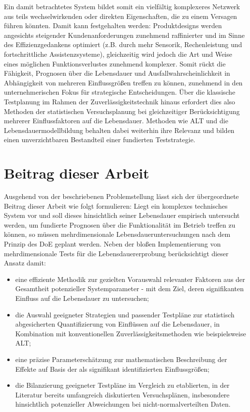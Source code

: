 Ein damit betrachtetes System bildet somit ein vielfältig komplexeres Netzwerk aus teils wechselwirkenden oder direkten Eigenschaften, die zu einem Versagen führen könnten.
Damit kann festgehalten werden: Produktdesigns werden angesichts steigender Kundenanforderungen zunehmend raffinierter und im Sinne des Effizienzgedankens optimiert (z.B. durch mehr Sensorik, Rechenleistung und fortschrittliche Assistenzsysteme), gleichzeitig wird jedoch die Art und Weise eines möglichen Funktionsverlustes zunehmend komplexer.
Somit rückt die Fähigkeit, Prognosen über die Lebensdauer und Ausfallwahrscheinlichkeit in Abhängigkeit von mehreren Einflussgrößen treffen zu können, zunehmend in den unternehmerischen Fokus für strategische Entscheidungen.
Über die klassische Testplanung im Rahmen der Zuverlässigkeitstechnik hinaus erfordert dies also Methoden der statistischen Versuchsplanung bei gleichzeitiger Berücksichtigung mehrerer Einflussfaktoren auf die Lebensdauer.
Methoden wie \acs{ALT} und die Lebensdauermodellbildung behalten dabei weiterhin ihre Relevanz und bilden einen unverzichtbaren Bestandteil einer fundierten Teststrategie.

\section{Beitrag dieser Arbeit} \label{sec:beitrag}
Ausgehend von der beschriebenen Problemstellung lässt sich der übergeordnete Beitrag dieser Arbeit wie folgt formulieren: Liegt ein komplexes technisches System vor und soll dieses hinsichtlich seiner Lebensdauer empirisch untersucht werden, um fundierte Prognosen über die Funktionalität im Betrieb treffen zu können, so müssen mehrdimensionale Lebensdaueruntersuchungen nach dem Prinzip des \ac{DoE} geplant werden.
Neben der bloßen Implementierung von mehrdimensionale Tests für die Lebensdauererprobung berücksichtigt dieser Ansatz damit:
\begin{itemize}
    \item eine effiziente Methodik zur gezielten Vorauswahl relevanter Faktoren aus der Gesamtheit potenzieller Systemparameter - mit dem Ziel, deren signifikanten Einfluss auf die Lebensdauer zu untersuchen;
    \item die Auswahl geeigneter Strategien und passender Testpläne zur statistisch abgesicherten Quantifizierung von Einflüssen auf die Lebensdauer, in Kombination mit konventionellen Zuverlässigkeitsmethoden wie beispielsweise \acs{ALT};
    \item eine präzise Parameterschätzung zur mathematischen Beschreibung der Effekte auf Basis der als signifikant identifizierten Einflussgrößen;
    \item die Bilanzierung geeigneter Testpläne im Vergleich zu etablierten, in der Literatur bereits umfangreich diskutierten Versuchsplänen, insbesondere hinsichtlich potenzieller Abweichungen bei nicht-normalverteilten Daten.
\end{itemize}

